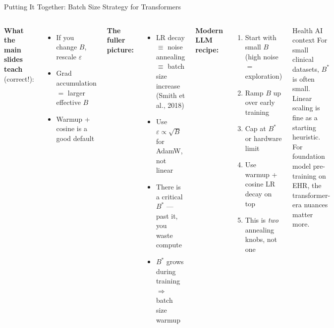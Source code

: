 \documentclass[aspectratio=169, 10pt]{beamer}
\newcommand{\good}[1]{\textcolor{GoodGreen!80!black}{#1}}
\begin{document}
\begin{frame}{Putting It Together: Batch Size Strategy for Transformers}

\begin{columns}[T]
\textbf{What the main slides teach} (correct!):
\begin{itemize}
  \item If you change $B$, rescale $\varepsilon$
  \item Grad accumulation $=$ larger effective $B$
  \item Warmup + cosine is a good default
\end{itemize}

\vspace{6pt}
\textbf{The fuller picture:}
\begin{itemize}
  \item LR decay $\equiv$ noise annealing $\equiv$ batch size increase (Smith et al., 2018)
  \item Use $\varepsilon \propto \sqrt{B}$ for AdamW, not linear
  \item There is a critical $B^*$ --- past it, you waste compute
  \item $B^*$ grows during training $\Rightarrow$ batch size warmup
\end{itemize}

\textbf{Modern LLM recipe:}
\begin{enumerate}
  \item Start with small $B$ (high noise $=$ exploration)
  \item Ramp $B$ up over early training
  \item Cap at $B^*$ or hardware limit
  \item Use warmup + cosine LR decay on top
  \item This is \emph{two} annealing knobs, not one
\end{enumerate}

\vspace{6pt}
\begin{exampleblock}{Health AI context}
For small clinical datasets, $B^*$ is often small. \good{Linear scaling is fine as a starting heuristic.} For foundation model pre-training on EHR, the transformer-era nuances matter more.
\end{exampleblock}
\end{columns}

\end{frame}
\end{document}
